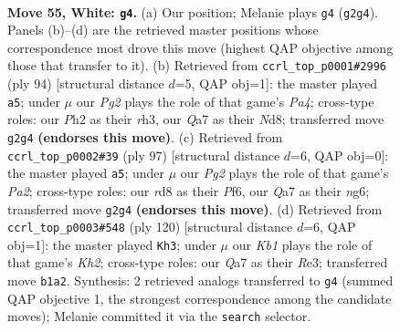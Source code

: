 \documentclass[11pt]{article}
\begin{document}
\clearpage

\begin{figure}[p]\centering
\begin{subfigure}{0.46\textwidth}\centering
\resizebox{\linewidth}{!}{%
\newchessgame
\chessboard[
  setfen={3r4/Q7/4k3/8/4P3/8/6PP/1K6 w - - 5 55},
  showmover=false,
  pgfstyle=straightmove, color=movearrow, markmove={g2-g4}
]}
\caption{}
\end{subfigure}\hfill
\begin{subfigure}{0.46\textwidth}\centering
\resizebox{\linewidth}{!}{%
\newchessgame
\chessboard[
  setfen={k2N4/8/P7/8/P7/7r/2K5/8 w - - 7 48},
  showmover=false,
  pgfstyle=straightmove, color=movearrow, markmove={a4-a5}
]}
\caption{}
\end{subfigure}
\\[4pt]
\begin{subfigure}{0.46\textwidth}\centering
\resizebox{\linewidth}{!}{%
\newchessgame
\chessboard[
  setfen={8/p2k4/5pN1/1p6/8/2K5/8/8 b - - 1 49},
  showmover=false,
  pgfstyle=straightmove, color=movearrow, markmove={a7-a5}
]}
\caption{}
\end{subfigure}\hfill
\begin{subfigure}{0.46\textwidth}\centering
\resizebox{\linewidth}{!}{%
\newchessgame
\chessboard[
  setfen={8/3r4/5k2/8/5P1P/4R3/7K/8 w - - 1 61},
  showmover=false,
  pgfstyle=straightmove, color=movearrow, markmove={h2-h3}
]}
\caption{}
\end{subfigure}
\caption{\textbf{Move 55, White: \texttt{g4}.} (a) Our position; Melanie plays \texttt{g4} (\texttt{g2g4}). Panels (b)--(d) are the retrieved master positions whose correspondence most drove this move (highest QAP objective among those that transfer to it). (b) Retrieved from \texttt{ccrl\_top\_p0001\#2996} (ply 94) [structural distance $d$=5, QAP obj=1]: the master played \texttt{a5}; under $\mu$ our \emph{Pg2} plays the role of that game's \emph{Pa4}; cross-type roles: our \emph{P}h2 as their \emph{r}h3, our \emph{Q}a7 as their \emph{N}d8; transferred move \texttt{g2g4} \textbf{(endorses this move)}. (c) Retrieved from \texttt{ccrl\_top\_p0002\#39} (ply 97) [structural distance $d$=6, QAP obj=0]: the master played \texttt{a5}; under $\mu$ our \emph{Pg2} plays the role of that game's \emph{Pa2}; cross-type roles: our \emph{r}d8 as their \emph{P}f6, our \emph{Q}a7 as their \emph{n}g6; transferred move \texttt{g2g4} \textbf{(endorses this move)}. (d) Retrieved from \texttt{ccrl\_top\_p0003\#548} (ply 120) [structural distance $d$=6, QAP obj=1]: the master played \texttt{Kh3}; under $\mu$ our \emph{Kb1} plays the role of that game's \emph{Kh2}; cross-type roles: our \emph{Q}a7 as their \emph{R}e3; transferred move \texttt{b1a2}. Synthesis: 2 retrieved analogs transferred to \texttt{g4} (summed QAP objective 1, the strongest correspondence among the candidate moves); Melanie committed it via the \texttt{search} selector.}
\label{fig:thought-m108}
\end{figure}
\end{document}
